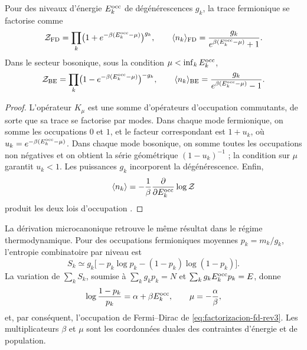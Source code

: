 \begin{theorem}
\label{thm:factorizacion-gran-canonica-rev3}
Pour des niveaux d’énergie \(E_k^{\rm occ}\) de dégénérescences \(g_k\), la
trace fermionique se factorise comme
\begin{equation}
 \mathcal Z_{\rm FD}
 =\prod_k\bigl(1+e^{-\beta(E_k^{\rm occ}-\mu)}\bigr)^{g_k},
 \qquad
 \langle n_k\rangle_{\rm FD}
 =\frac{g_k}{e^{\beta(E_k^{\rm occ}-\mu)}+1}.
 \label{eq:factorizacion-fd-rev3}
\end{equation}
Dans le secteur bosonique, sous la condition
\(\mu<\inf_kE_k^{\rm occ}\),
\begin{equation}
 \mathcal Z_{\rm BE}
 =\prod_k\bigl(1-e^{-\beta(E_k^{\rm occ}-\mu)}\bigr)^{-g_k},
 \qquad
 \langle n_k\rangle_{\rm BE}
 =\frac{g_k}{e^{\beta(E_k^{\rm occ}-\mu)}-1}.
 \label{eq:factorizacion-be-rev3}
\end{equation}
\end{theorem}

\begin{proof}
L’opérateur \(K_\mu\) est une somme d’opérateurs d’occupation commutants, de
sorte que sa trace se factorise par modes. Dans chaque mode fermionique, on somme les
occupations \(0\) et \(1\), et le facteur correspondant est
\(1+u_k\), où
\(u_k=e^{-\beta(E_k^{\rm occ}-\mu)}\). Dans chaque mode bosonique, on somme toutes
les occupations non négatives et on obtient la série géométrique
\((1-u_k)^{-1}\) ; la condition sur \(\mu\) garantit \(u_k<1\). Les
puissances \(g_k\) incorporent la dégénérescence. Enfin,
\[
 \langle n_k\rangle
 =-\frac1\beta\frac{\partial}{\partial E_k^{\rm occ}}
   \log\mathcal Z
\]
produit les deux lois d’occupation
\cite{Bose1924,Einstein1924,Fermi1926,Dirac1926,Pathria2011}.
\end{proof}

La dérivation microcanonique retrouve le même résultat dans le régime
thermodynamique. Pour des occupations fermioniques moyennes
\(p_k=m_k/g_k\), l’entropie combinatoire par niveau est
\begin{equation}
 S_k\simeq
 g_k\bigl[-p_k\log p_k-(1-p_k)\log(1-p_k)\bigr].
 \label{eq:entropia-fd-nivel-rev3}
\end{equation}
La variation de \(\sum_kS_k\), soumise à
\(\sum_kg_kp_k=N\) et
\(\sum_kg_kE_k^{\rm occ}p_k=E\), donne
\begin{equation}
 \log\frac{1-p_k}{p_k}=\alpha+\beta E_k^{\rm occ},
 \qquad
 \mu=-\frac{\alpha}{\beta},
 \label{eq:variacion-fd-rev3}
\end{equation}
et, par conséquent, l’occupation de Fermi--Dirac de \eqref{eq:factorizacion-fd-rev3}. Les multiplicateurs \(\beta\) et \(\mu\) sont les coordonnées duales des contraintes d’énergie et de population.

